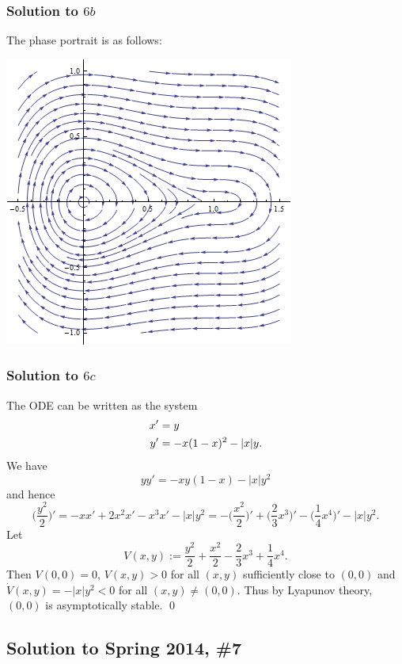 \subsubsection*{Solution to $6b$}
The phase portrait is as follows:
\begin{center}
\includegraphics[scale=0.75]{./_Figures/S14Q6.png}
\end{center}

\subsubsection*{Solution to $6c$}
The ODE can be written as the system
\begin{equation}\label{s146aeq2}
\begin{aligned}
x' & = y\\
y' &= -x(1-x)^{2} - |x|y.
\end{aligned}
\end{equation}
We have
$$yy' = -xy(1 - x) - |x|y^{2}$$
and hence
$$\bigg(\frac{y^{2}}{2}\bigg)' = -xx' + 2x^{2}x' - x^{3}x' - |x|y^{2} = -\bigg(\frac{x^{2}}{2}\bigg)' + \bigg(\frac{2}{3}x^{3}\bigg)' - \bigg(\frac{1}{4}x^{4}\bigg)' - |x|y^{2}.$$
Let
$$V(x, y) := \frac{y^{2}}{2} + \frac{x^{2}}{2} - \frac{2}{3}x^{3} + \frac{1}{4}x^{4}.$$
Then $V(0, 0) = 0$, $V(x, y) > 0$ for all $(x, y)$ sufficiently close to $(0, 0)$ and
$\dot{V}(x, y) = -|x|y^{2} < 0$ for all $(x, y) \neq (0, 0)$. Thus by Lyapunov theory, $(0, 0)$ is asymptotically stable.
\hfill\qed

\subsection*{Solution to Spring 2014, \#7}\label{s147}

